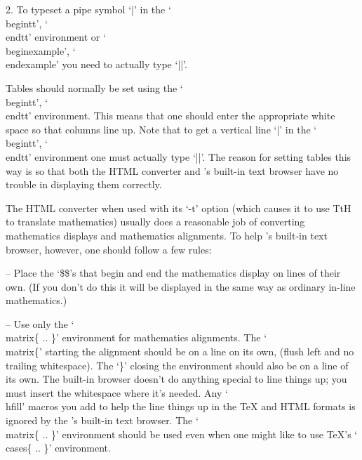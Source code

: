 \item{2.}
To typeset a pipe symbol `|' in the `\\begintt', `\\endtt' environment or
`\\beginexample', `\\endexample' you need to actually type `||'.

\endlist


\indextt{\\matrix}
Tables  should  normally  be  set  using   the   `\\begintt',   `\\endtt'
environment. This means that one should enter the appropriate white space
so that columns line up. Note that to get a  vertical  line  `|'  in  the
`\\begintt', `\\endtt' environment  one  must  actually  type  `||'.  The
reason for setting tables this way is so that both the HTML converter and
{\GAP}'s built-in  text  browser  have  no  trouble  in  displaying  them
correctly.

The HTML converter when used with its `-t' option (which causes it to use
TtH to translate mathematics) usually does a reasonable job of converting
mathematics  displays  and  mathematics  alignments.  To  help   {\GAP}'s
built-in text browser, however, one should follow a few rules:

\beginlist%

\item{--} Place the `\$\$'s that begin and end the mathematics display on
lines of their own. (If you don't do this it will  be  displayed  in  the
same way as ordinary in-line mathematics.)

\item{--} Use only the `\\matrix\{ ..  \}'  environment  for  mathematics
alignments. The `\\matrix\{' starting the alignment should be on  a  line
on its own, (flush left and no trailing whitespace). The `\}' closing the
environment should also be on a line of its  own.  The  built-in  browser
doesn't do anything special to  line  things  up;  you  must  insert  the
whitespace where it's needed. Any `\\hfill' macros you add  to  help  the
line things up in the {\TeX} and HTML formats is ignored by the  {\GAP}'s
built-in text browser. The `\\matrix\{ .. \}' environment should be  used
even when one might like to use {\TeX}'s `\\cases\{ .. \}' environment.

